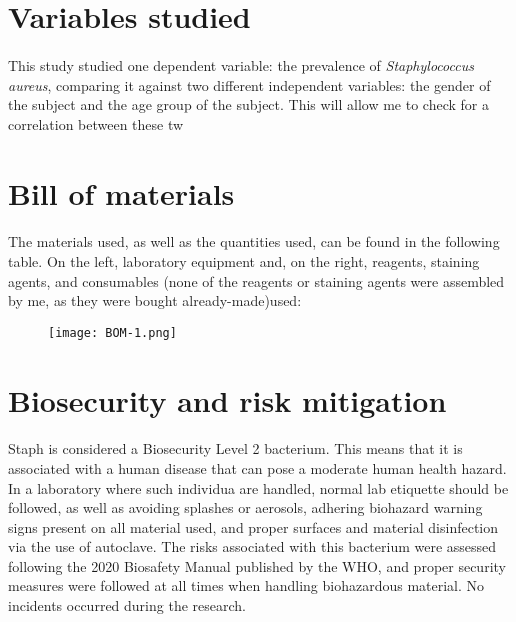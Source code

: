 \section{Variables studied}
\paragraph{}This study studied one dependent variable: the prevalence of \emph{Staphylococcus aureus}, comparing it against two different independent variables: the gender of the subject and the age group of the subject. This will allow me to check for a correlation between these tw
\section{Bill of materials}
\paragraph{}The materials used, as well as the quantities used, can be found in the following table. On the left, laboratory equipment and, on the right, reagents, staining agents, and consumables (none of the reagents or staining agents were assembled by me, as they were bought already-made)used:
\begin{center}\begin{figure}[H]\centering\texttt{[image: BOM-1.png]}\end{figure}\end{center}
\section{Biosecurity and risk mitigation}
\paragraph{}Staph is considered a Biosecurity Level 2 bacterium\cite{cheungPathogenicityVirulenceStaphylococcus2021}. This means that it is associated with a human disease that can pose a moderate human health hazard. In a laboratory where such individua are handled, normal lab etiquette should be followed, as well as avoiding splashes or aerosols, adhering biohazard warning signs present on all material used, and proper surfaces and material disinfection via the use of autoclave.\newline
The risks associated with this bacterium were assessed following the 2020 Biosafety Manual published by the WHO, and proper security measures were followed at all times when handling biohazardous material. No incidents occurred during the research\cite{worldhealthorganizationLaboratoryBiosafetyManual2020}.
